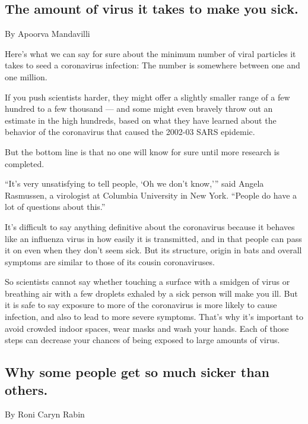 \hypertarget{the-amount-of-virus-it-takes-to-make-you-sick}{%
\subsection{The amount of virus it takes to make you
sick.}\label{the-amount-of-virus-it-takes-to-make-you-sick}}

By Apoorva Mandavilli

Here's what we can say for sure about the minimum number of viral
particles it takes to seed a coronavirus infection: The number is
somewhere between one and one million.

If you push scientists harder, they might offer a slightly smaller range
of a few hundred to a few thousand --- and some might even bravely throw
out an estimate in the high hundreds, based on what they have learned
about the behavior of the coronavirus that caused the 2002-03 SARS
epidemic.

But the bottom line is that no one will know for sure until more
research is completed.

``It's very unsatisfying to tell people, `Oh we don't know,''' said
Angela Rasmussen, a virologist at Columbia University in New York.
``People do have a lot of questions about this.''

It's difficult to say anything definitive about the coronavirus because
it behaves like an influenza virus in how easily it is transmitted, and
in that people can pass it on even when they don't seem sick. But its
structure, origin in bats and overall symptoms are similar to those of
its cousin coronaviruses.

So scientists cannot say whether touching a surface with a smidgen of
virus or breathing air with a few droplets exhaled by a sick person will
make you ill. But it is safe to say exposure to more of the coronavirus
is more likely to cause infection, and also to lead to more severe
symptoms. That's why it's important to avoid crowded indoor spaces, wear
masks and wash your hands. Each of those steps can decrease your chances
of being exposed to large amounts of virus.

\hypertarget{why-some-people-get-so-much-sicker-than-others}{%
\subsection{Why some people get so much sicker than
others.}\label{why-some-people-get-so-much-sicker-than-others}}

By Roni Caryn Rabin

